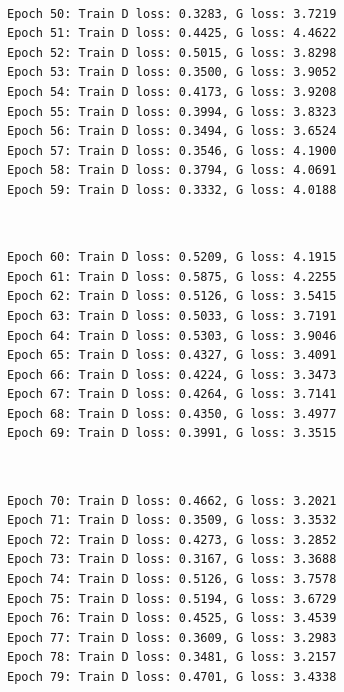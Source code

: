 \documentclass[11pt]{article}
\begin{document}
    \begin{center}
    \end{center}
    { \hspace*{\fill} \\}
    
    \begin{Verbatim}[commandchars=\\\{\}]
Epoch 50: Train D loss: 0.3283, G loss: 3.7219
Epoch 51: Train D loss: 0.4425, G loss: 4.4622
Epoch 52: Train D loss: 0.5015, G loss: 3.8298
Epoch 53: Train D loss: 0.3500, G loss: 3.9052
Epoch 54: Train D loss: 0.4173, G loss: 3.9208
Epoch 55: Train D loss: 0.3994, G loss: 3.8323
Epoch 56: Train D loss: 0.3494, G loss: 3.6524
Epoch 57: Train D loss: 0.3546, G loss: 4.1900
Epoch 58: Train D loss: 0.3794, G loss: 4.0691
Epoch 59: Train D loss: 0.3332, G loss: 4.0188

    \end{Verbatim}

    \begin{center}
    \end{center}
    { \hspace*{\fill} \\}
    
    \begin{Verbatim}[commandchars=\\\{\}]
Epoch 60: Train D loss: 0.5209, G loss: 4.1915
Epoch 61: Train D loss: 0.5875, G loss: 4.2255
Epoch 62: Train D loss: 0.5126, G loss: 3.5415
Epoch 63: Train D loss: 0.5033, G loss: 3.7191
Epoch 64: Train D loss: 0.5303, G loss: 3.9046
Epoch 65: Train D loss: 0.4327, G loss: 3.4091
Epoch 66: Train D loss: 0.4224, G loss: 3.3473
Epoch 67: Train D loss: 0.4264, G loss: 3.7141
Epoch 68: Train D loss: 0.4350, G loss: 3.4977
Epoch 69: Train D loss: 0.3991, G loss: 3.3515

    \end{Verbatim}

    \begin{center}
    \end{center}
    { \hspace*{\fill} \\}
    
    \begin{Verbatim}[commandchars=\\\{\}]
Epoch 70: Train D loss: 0.4662, G loss: 3.2021
Epoch 71: Train D loss: 0.3509, G loss: 3.3532
Epoch 72: Train D loss: 0.4273, G loss: 3.2852
Epoch 73: Train D loss: 0.3167, G loss: 3.3688
Epoch 74: Train D loss: 0.5126, G loss: 3.7578
Epoch 75: Train D loss: 0.5194, G loss: 3.6729
Epoch 76: Train D loss: 0.4525, G loss: 3.4539
Epoch 77: Train D loss: 0.3609, G loss: 3.2983
Epoch 78: Train D loss: 0.3481, G loss: 3.2157
Epoch 79: Train D loss: 0.4701, G loss: 3.4338

    \end{Verbatim}
\end{document}
